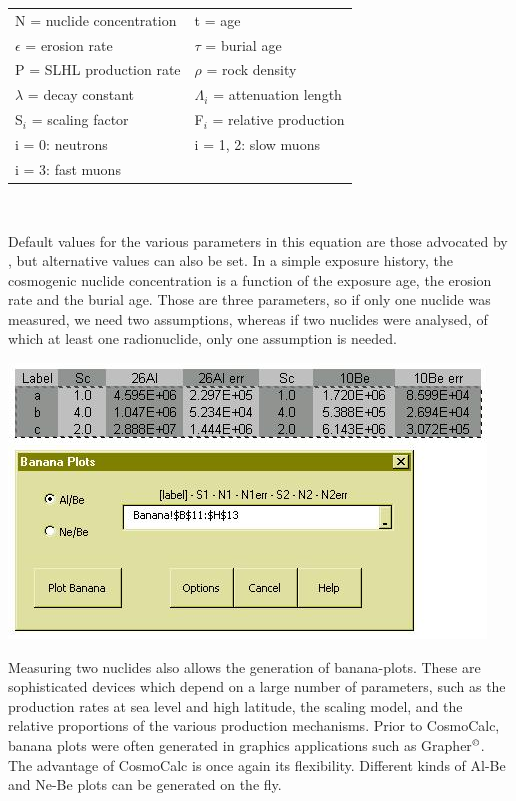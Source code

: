 \documentclass[12pt]{article}
\begin{document}
\begin{center}
  \begin{tabular}{ll}
N = nuclide concentration & t = age\\
$\epsilon$ = erosion rate & $\tau$ = burial age \\
P = SLHL production rate & $\rho$ = rock density\\
$\lambda$ = decay constant & $\Lambda_i$ = attenuation length \\
S$_i$ = scaling factor & F$_i$ = relative production\\
i = 0: neutrons & i = 1, 2: slow muons\\
i = 3: fast muons & ~\\
\end{tabular}\\
\end{center}

Default values for  the various parameters in this  equation are those
advocated by  \cite{granger2000}, but  alternative values can  also be
set.    In  a   simple  exposure   history,  the   cosmogenic  nuclide
concentration is a function of  the exposure age, the erosion rate and
the burial  age.  Those are three  parameters, so if  only one nuclide
was measured,  we need two  assumptions, whereas if two  nuclides were
analysed, of which  at least one radionuclide, only  one assumption is
needed.
\\

\begin{minipage}[tbp]{\textwidth}
  \begin{center}
  \includegraphics[width=.6\textwidth]{AlBeBanana.jpg}\\
  \end{center}
  Measuring two  nuclides also allows the generation  of banana-plots. 
  These are  sophisticated devices which  depend on a large  number of
  parameters,  such as  the production  rates  at sea  level and  high
  latitude,  the scaling model,  and the  relative proportions  of the
  various production mechanisms. Prior to CosmoCalc, banana plots were
  often    generated     in    graphics    applications     such    as
  Grapher$^\copyright$.  The advantage of  CosmoCalc is once again its
  flexibility.   Different  kinds of  Al-Be  and  Ne-Be  plots can  be
  generated on the fly.
  \\
\end{minipage}
\end{document}
